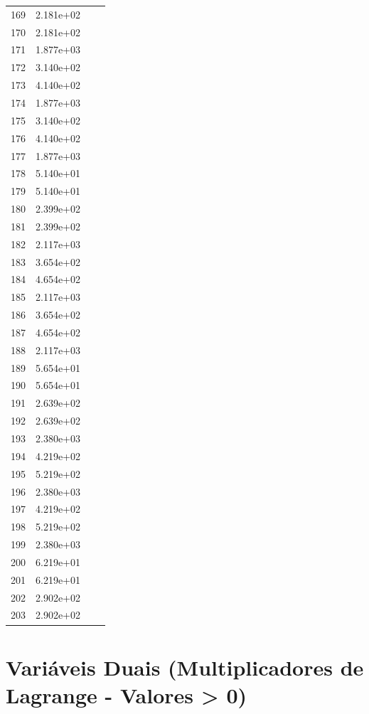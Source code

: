 \documentclass[12pt]{article}
\begin{document}
\begin{longtable}{@{}cccc@{}}
169 & 2.181e+02 &  &  \\
170 & 2.181e+02 &  &  \\
171 & 1.877e+03 &  &  \\
172 & 3.140e+02 &  &  \\
173 & 4.140e+02 &  &  \\
174 & 1.877e+03 &  &  \\
175 & 3.140e+02 &  &  \\
176 & 4.140e+02 &  &  \\
177 & 1.877e+03 &  &  \\
178 & 5.140e+01 &  &  \\
179 & 5.140e+01 &  &  \\
180 & 2.399e+02 &  &  \\
181 & 2.399e+02 &  &  \\
182 & 2.117e+03 &  &  \\
183 & 3.654e+02 &  &  \\
184 & 4.654e+02 &  &  \\
185 & 2.117e+03 &  &  \\
186 & 3.654e+02 &  &  \\
187 & 4.654e+02 &  &  \\
188 & 2.117e+03 &  &  \\
189 & 5.654e+01 &  &  \\
190 & 5.654e+01 &  &  \\
191 & 2.639e+02 &  &  \\
192 & 2.639e+02 &  &  \\
193 & 2.380e+03 &  &  \\
194 & 4.219e+02 &  &  \\
195 & 5.219e+02 &  &  \\
196 & 2.380e+03 &  &  \\
197 & 4.219e+02 &  &  \\
198 & 5.219e+02 &  &  \\
199 & 2.380e+03 &  &  \\
200 & 6.219e+01 &  &  \\
201 & 6.219e+01 &  &  \\
202 & 2.902e+02 &  &  \\
203 & 2.902e+02 &  &  \\

\bottomrule
\end{longtable}


\section{Variáveis Duais (Multiplicadores de Lagrange - Valores > 0)}
\end{document}
